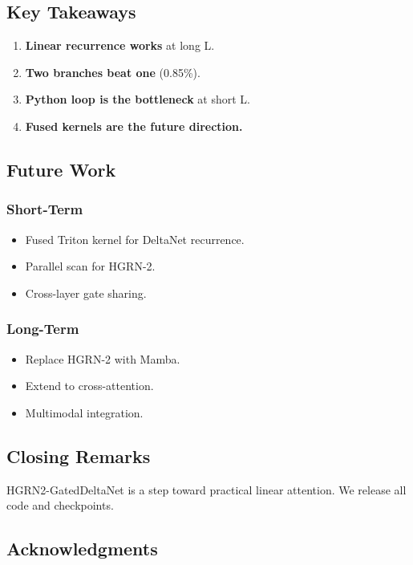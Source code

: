 \subsection{Key Takeaways}

\begin{enumerate}
\item \textbf{Linear recurrence works} at long L.
\item \textbf{Two branches beat one} (0.85\%).
\item \textbf{Python loop is the bottleneck} at short L.
\item \textbf{Fused kernels are the future direction.}

\end{enumerate}
\subsection{Future Work}

\subsubsection{Short-Term}
\begin{itemize}
\item Fused Triton kernel for DeltaNet recurrence.
\item Parallel scan for HGRN-2.
\item Cross-layer gate sharing.

\end{itemize}
\subsubsection{Long-Term}
\begin{itemize}
\item Replace HGRN-2 with Mamba.
\item Extend to cross-attention.
\item Multimodal integration.

\end{itemize}
\subsection{Closing Remarks}

HGRN2-GatedDeltaNet is a step toward practical linear attention. We 
release all code and checkpoints.

\subsection{Acknowledgments}

